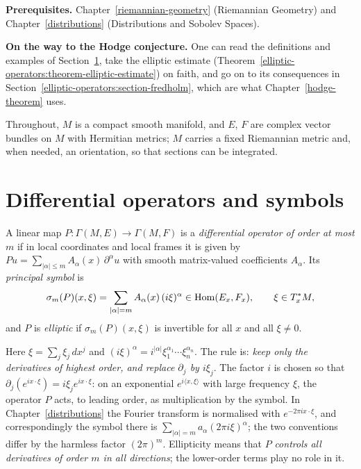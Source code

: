 \noindent\textbf{Prerequisites.} Chapter~\ref{riemannian-geometry} (Riemannian Geometry) and Chapter~\ref{distributions}
(Distributions and Sobolev Spaces).

\noindent\textbf{On the way to the Hodge conjecture.} One can read the definitions and examples of Section~\ref{elliptic-operators:section-symbols}, take the elliptic estimate
(Theorem~\ref{elliptic-operators:theorem-elliptic-estimate}) on faith, and go on to its consequences in Section~\ref{elliptic-operators:section-fredholm}, which are what Chapter~\ref{hodge-theorem} uses.

Throughout, $M$ is a compact smooth manifold, and $E$, $F$ are complex vector bundles on $M$ with Hermitian metrics; $M$ carries a
fixed Riemannian metric and, when needed, an orientation, so that sections can be integrated.

\section{Differential operators and symbols}\label{elliptic-operators:section-symbols}

\begin{definition}\label{elliptic-operators:definition-differential-operator}
A linear map $P \colon \Gamma(M, E) \to \Gamma(M, F)$ is a \emph{differential operator of order at most $m$} if in local coordinates and local frames it is given by
$Pu = \sum_{|\alpha| \leq m}A_\alpha(x)\,\partial^\alpha u$ with smooth matrix-valued coefficients $A_\alpha$. Its \emph{principal symbol} is
\[
\sigma_m(P)(x, \xi) = \sum_{|\alpha| = m}A_\alpha(x)\,(i\xi)^\alpha \in \operatorname{Hom}(E_x, F_x), \qquad \xi \in T^*_xM,
\]
and $P$ is \emph{elliptic} if $\sigma_m(P)(x, \xi)$ is invertible for all $x$ and all $\xi \neq 0$.
\end{definition}

Here $\xi = \sum_j\xi_j\,dx^j$ and $(i\xi)^\alpha = i^{|\alpha|}\xi_1^{\alpha_1} \cdots \xi_n^{\alpha_n}$. The rule is: \emph{keep only the derivatives of highest order, and replace $\partial_j$ by $i\xi_j$}. The
factor $i$ is chosen so that $\partial_j(e^{ix\cdot\xi}) = i\xi_je^{ix\cdot\xi}$: on an exponential $e^{i\langle x, \xi\rangle}$ with large frequency $\xi$, the operator $P$ acts, to leading order, as multiplication by
the symbol. In Chapter~\ref{distributions} the Fourier transform is normalised with $e^{-2\pi ix\cdot\xi}$, and correspondingly the symbol there is $\sum_{|\alpha| = m}a_\alpha(2\pi i\xi)^\alpha$; the two
conventions differ by the harmless factor $(2\pi)^m$. Ellipticity means that $P$ \emph{controls all derivatives of order $m$ in all directions}; the lower-order terms play no role in it.

